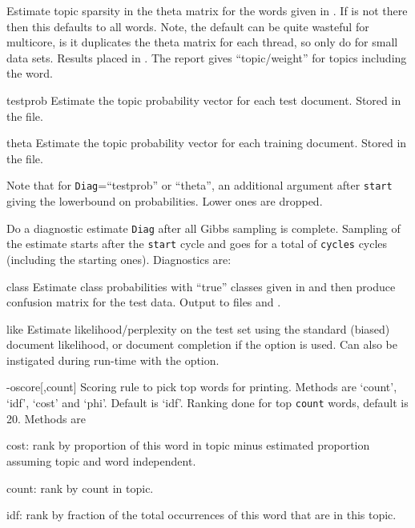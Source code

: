 \documentclass[a4paper,english]{article}
\begin{document}
\begin{Description}
\begin{Description}[testprob]
Estimate topic sparsity in the theta matrix for the
words given in .
If  is not there then this defaults to all words.
Note, the default can be quite wasteful for multicore, is it duplicates the theta matrix
for each thread, so only do for small data sets.
Results placed in .
The report gives ``topic/weight'' for topics including the word.
\item[testprob] 
Estimate the topic probability vector for each test document.  
Stored in the  file.
\item[theta] 
Estimate the topic probability vector for each training document.
Stored in the  file.
\end{Description}
Note that for \texttt{Diag}=``testprob'' or ``theta'',
an additional argument after \texttt{start} giving the lowerbound
on probabilities.  Lower ones are dropped.
\item[\OptArg{-L}{Diag,cycles,start}] 
Do a diagnostic estimate \texttt{Diag} after
all Gibbs sampling is complete.
Sampling of the estimate starts after the \texttt{start} cycle 
and goes for a total of \texttt{cycles} cycles
(including the starting ones).
Diagnostics are:
\begin{Description}[class]\setlength{\itemsep}{0cm}
\item[class] 
Estimate class probabilities with ``true'' classes
given in  and then
produce confusion matrix for the test data.
Output to files
 and .
\item[like] 
Estimate likelihood/perplexity on the test set
using the standard (biased) document likelihood,
or document completion if the 
option is used.
Can also be instigated during run-time with the
 option.
\end{Description}
\item[{-o}{score[,count]}]  Scoring rule to pick top words for printing.
Methods are `count', `idf', `cost' and `phi'.  Default is `idf'.
Ranking done for top \texttt{count} words, default is 20.
Methods are
\begin{Description}
\item[cost:] rank by proportion of this word in topic
       minus estimated proportion assuming topic and word independent.
\item[count:] rank by count in topic.
\item[idf:] rank by fraction of the total occurrences of
       this word  that are in this topic.

\end{Description}
\end{Description}
\end{document}
